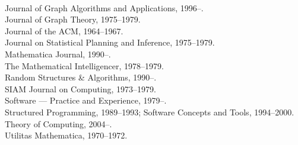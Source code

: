 \\Journal of Graph Algorithms and Applications, 1996--.
\\Journal of Graph Theory, 1975--1979.
\\Journal of the ACM, 1964--1967.
\\Journal on Statistical Planning and Inference, 1975--1979.
\\Mathematica Journal, 1990--.
\\The Mathematical Intelligencer, 1978--1979.
\\Random Structures \& Algorithms, 1990--.
\\SIAM Journal on Computing, 1973--1979.
\\Software --- Practice and Experience, 1979--.
\\Structured Programming, 1989--1993; Software Concepts and Tools, 1994--2000.
\\Theory of Computing, 2004--.
\\Utilitas Mathematica, 1970--1972.
\finishpage

